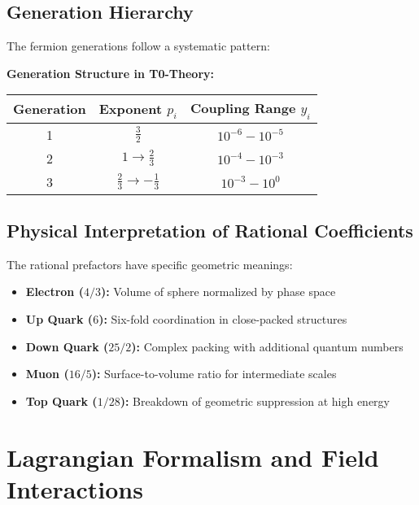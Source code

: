 \documentclass[12pt,a4paper]{article}
\theoremstyle{definition}
\begin{document}
\subsection{Generation Hierarchy}

The fermion generations follow a systematic pattern:

\noindent
\textbf{Generation Structure in T0-Theory:}

\begin{center}
	\begin{tabular}{ccc}
		\toprule
		\textbf{Generation} & \textbf{Exponent} $p_i$ & \textbf{Coupling Range} $y_i$ \\
		\midrule
		1 & $\frac{3}{2}$ & $10^{-6} - 10^{-5}$ \\
		2 & $1 \rightarrow \frac{2}{3}$ & $10^{-4} - 10^{-3}$ \\
		3 & $\frac{2}{3} \rightarrow -\frac{1}{3}$ & $10^{-3} - 10^0$ \\
		\bottomrule
	\end{tabular}
\end{center}

\subsection{Physical Interpretation of Rational Coefficients}

The rational prefactors have specific geometric meanings:

\begin{itemize}
	\item \textbf{Electron ($4/3$):} Volume of sphere normalized by phase space
	\item \textbf{Up Quark ($6$):} Six-fold coordination in close-packed structures
	\item \textbf{Down Quark ($25/2$):} Complex packing with additional quantum numbers
	\item \textbf{Muon ($16/5$):} Surface-to-volume ratio for intermediate scales
	\item \textbf{Top Quark ($1/28$):} Breakdown of geometric suppression at high energy
\end{itemize}


\section{Lagrangian Formalism and Field Interactions}
\end{document}
